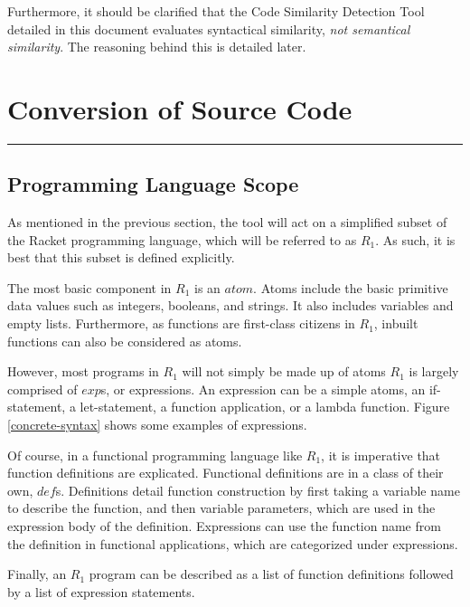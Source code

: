 \documentclass[12pt]{article}
\newcommand{\R}{\ensuremath{\mathit{R_{1}}}}
\newcommand{\itm}[1]{\ensuremath{\mathit{#1}}}
\newcommand{\Atm}[0]{\itm{atom}}
\newcommand{\Exp}[0]{\itm{exp}}
\newcommand{\Def}[0]{\itm{def}}
\newcommand{\usection}[1]{\section{#1}\hrule\hfill}
\begin{document}
\hfill

Furthermore, it should be clarified that the Code Similarity Detection Tool detailed in this document evaluates syntactical similarity, \emph{not semantical similarity}. The reasoning behind this is detailed later.

\usection{Conversion of Source Code}

\subsection{Programming Language Scope}

As mentioned in the previous section, the tool will act on a simplified subset of the Racket programming language, which will be referred to as \R{}. As such, it is best that this subset is defined explicitly.

\hfill

The most basic component in \R{} is an \Atm{}. Atoms include the basic primitive data values such as integers, booleans, and strings. It also includes variables and empty lists. Furthermore, as functions are first-class citizens in \R{}, inbuilt functions can also be considered as atoms.

\hfill

However, most programs in \R{} will not simply be made up of atoms \textemdash \R{} is largely comprised of \Exp{}s, or expressions. An expression can be a simple atoms, an if-statement, a let-statement, a function application, or a lambda function. Figure \ref{concrete-syntax} shows some examples of expressions.

\hfill

Of course, in a functional programming language like \R{}, it is imperative that function definitions are explicated. Functional definitions are in a class of their own, \Def{}s. Definitions detail function construction by first taking a variable name to describe the function, and then variable parameters, which are used in the expression body of the definition. Expressions can use the function name from the definition in functional applications, which are categorized under expressions.

\hfill

Finally, an \R{} program can be described as a list of function definitions followed by a list of expression statements.
\end{document}
